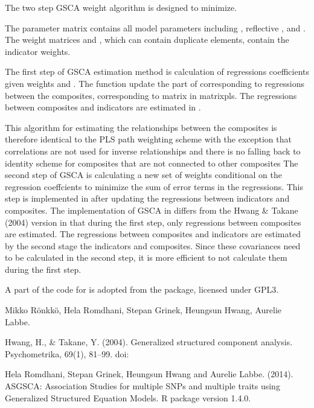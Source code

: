 \documentclass[a4paper]{book}
\begin{document}
\begin{Details}\relax
The two step GSCA weight algorithm is designed to minimize.


The parameter matrix  contains all model parameters including
, reflective , and . The weight
matrices  and , which can contain duplicate elements,
contain the indicator weights.

The first step of GSCA estimation method is calculation of regressions
coefficients  given weights  and . The function
 update the part of  corresponding to 
regressions between the composites, corresponding to  matrix in 
matrixpls. The regressions between composites and indicators are estimated
in .

This algorithm for estimating the relationships between the composites
is therefore identical to the PLS path weighting scheme with
the exception that correlations are not used for inverse relationships and
there is no falling back to identity scheme for composites that are not
connected to other composites
The second step of GSCA is calculating a new set of weights conditional on
the regression coeffcients  to minimize the sum of error terms in
the regressions. This step is implemented in  after
updating the regressions between indicators and composites.
The implementation of GSCA in  differs from the Hwang \& Takane (2004)
version in that during the first step, only regressions between composites are
estimated. The regressions between composites and indicators are estimated by
the second stage 
the indicators and composites. Since these covariances need to be calculated in the second step, it is more
efficient to not calculate them during the first step.

A part of the code for  is adopted from the  package, licensed
under GPL3.
\end{Details}
%
\begin{Author}\relax
Mikko Rönkkö, Hela Romdhani, Stepan Grinek, Heungsun Hwang, Aurelie Labbe.
\end{Author}
%
\begin{References}\relax
Hwang, H., \& Takane, Y. (2004). Generalized structured component analysis. 
Psychometrika, 69(1), 81–99. doi:\nobreakspace{}

Hela Romdhani, Stepan Grinek, Heungsun Hwang and Aurelie Labbe. (2014). 
ASGSCA: Association Studies for multiple SNPs and multiple traits using
Generalized Structured Equation Models. R package version 1.4.0.
\end{References}
\end{document}
